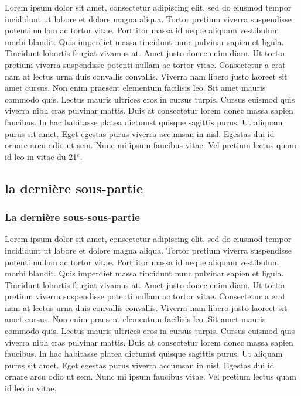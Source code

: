 Lorem ipsum dolor sit amet, consectetur adipiscing elit, sed do eiusmod
tempor incididunt ut labore et dolore magna aliqua. Tortor pretium
viverra suspendisse potenti nullam ac tortor vitae. Porttitor massa id
neque aliquam vestibulum morbi blandit. Quis imperdiet massa tincidunt
nunc pulvinar sapien et ligula. Tincidunt lobortis feugiat vivamus
at. Amet justo donec enim diam. Ut tortor pretium viverra suspendisse
potenti nullam ac tortor vitae. Consectetur a erat nam at lectus urna
duis convallis convallis. Viverra nam libero justo laoreet sit amet
cursus. Non enim praesent elementum facilisis leo. Sit amet mauris
commodo quis. Lectus mauris ultrices eros in cursus turpis. Cursus euismod
quis viverra nibh cras pulvinar mattis. Duis at consectetur lorem donec
massa sapien faucibus. In hac habitasse platea dictumst quisque sagittis
purus. Ut aliquam purus sit amet. Eget egestas purus viverra accumsan
in nisl. Egestas dui id ornare arcu odio ut sem. Nunc mi ipsum faucibus
vitae. Vel pretium lectus quam id leo in vitae du 21$^e$.

\subsection{la dernière sous-partie}

\subsubsection{La dernière sous-sous-partie}

Lorem ipsum dolor sit amet, consectetur adipiscing elit, sed do eiusmod
tempor incididunt ut labore et dolore magna aliqua. Tortor pretium
viverra suspendisse potenti nullam ac tortor vitae. Porttitor massa id
neque aliquam vestibulum morbi blandit. Quis imperdiet massa tincidunt
nunc pulvinar sapien et ligula. Tincidunt lobortis feugiat vivamus
at. Amet justo donec enim diam. Ut tortor pretium viverra suspendisse
potenti nullam ac tortor vitae. Consectetur a erat nam at lectus urna
duis convallis convallis. Viverra nam libero justo laoreet sit amet
cursus. Non enim praesent elementum facilisis leo. Sit amet mauris
commodo quis. Lectus mauris ultrices eros in cursus turpis. Cursus euismod
quis viverra nibh cras pulvinar mattis. Duis at consectetur lorem donec
massa sapien faucibus. In hac habitasse platea dictumst quisque sagittis
purus. Ut aliquam purus sit amet. Eget egestas purus viverra accumsan
in nisl. Egestas dui id ornare arcu odio ut sem. Nunc mi ipsum faucibus
vitae. Vel pretium lectus quam id leo in vitae.

